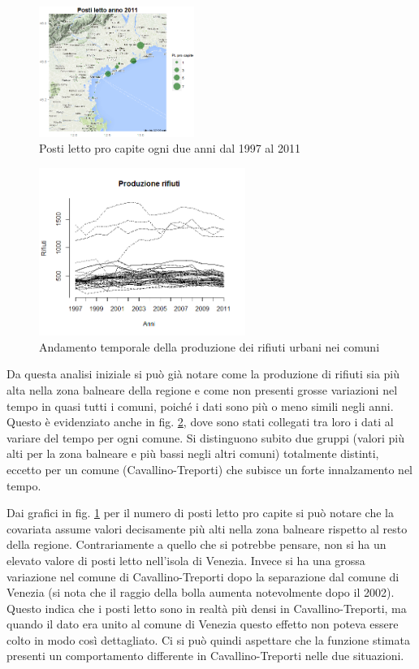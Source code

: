 \documentclass[a4paper,11pt,twoside,openright]{book}							%
\begin{document}
\begin{figure}[H]
	\includegraphics[trim=0cm 0cm 0cm 0cm,clip=true,width=0.45\textwidth]{Immagini/venezia_dati/PL2011.png}
	\caption{Posti letto pro capite ogni due anni dal 1997 al 2011}
	\label{fig:Ven_bubblePL}
\end{figure}
\newpage
\begin{figure}[t]
\centering
	\includegraphics[width=0.60\textwidth]{Immagini/Matplot.png}   
 \caption{Andamento temporale della produzione dei rifiuti urbani nei comuni}
   \label{fig:Ven_matplot}
\end{figure}
Da questa analisi iniziale si può già notare come la produzione di rifiuti sia più alta nella zona balneare della regione e come non presenti grosse variazioni nel tempo in quasi tutti i comuni, poiché i dati sono più o meno simili negli anni. Questo è evidenziato anche in fig. \ref{fig:Ven_matplot}, dove sono stati collegati tra loro i dati al variare del tempo per ogni comune. Si distinguono subito due gruppi (valori più alti per la zona balneare e più bassi negli altri comuni) totalmente distinti, eccetto per un comune (Cavallino-Treporti) che subisce un forte innalzamento nel tempo.

Dai grafici in fig. \ref{fig:Ven_bubblePL} per il numero di posti letto pro capite si può notare che la covariata assume valori decisamente più alti nella zona balneare rispetto al resto della regione. Contrariamente a quello che si potrebbe pensare, non si ha un elevato valore di posti letto nell'isola di Venezia. Invece si ha una grossa variazione nel comune di Cavallino-Treporti dopo la separazione dal comune di Venezia (si nota che il raggio della bolla aumenta notevolmente dopo il 2002). Questo indica che i posti letto sono in realtà più densi in Cavallino-Treporti, ma quando il dato era unito al comune di Venezia questo effetto non poteva essere colto in modo così dettagliato. Ci si può quindi aspettare che la funzione stimata presenti un comportamento differente in Cavallino-Treporti nelle due situazioni.
\end{document}

